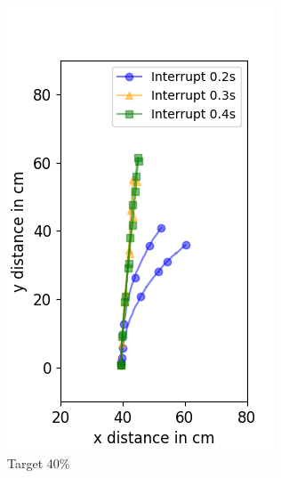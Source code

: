 \begin{figure}
	\begin{subfigure}[b]{0.32\textwidth}
		\includegraphics[width=\textwidth]{pics/figure_40.png}
		\caption{Target 40\%}
		\label{fig:target_40}
	\end{subfigure}
	\begin{subfigure}[b]{0.32\textwidth}

\end{subfigure}
\end{figure}
